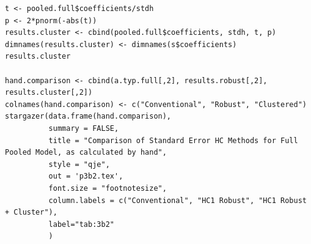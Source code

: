 \documentclass[letterpaper, 12pt]{article}
\begin{document}
\begin{lstlisting}
t <- pooled.full$coefficients/stdh
p <- 2*pnorm(-abs(t))
results.cluster <- cbind(pooled.full$coefficients, stdh, t, p)
dimnames(results.cluster) <- dimnames(s$coefficients)
results.cluster

hand.comparison <- cbind(a.typ.full[,2], results.robust[,2], results.cluster[,2])
colnames(hand.comparison) <- c("Conventional", "Robust", "Clustered")
stargazer(data.frame(hand.comparison),
          summary = FALSE,
          title = "Comparison of Standard Error HC Methods for Full Pooled Model, as calculated by hand",
          style = "qje",
          out = 'p3b2.tex',
          font.size = "footnotesize", 
          column.labels = c("Conventional", "HC1 Robust", "HC1 Robust + Cluster"),
          label="tab:3b2"
          )
\end{lstlisting}


\end{document}
